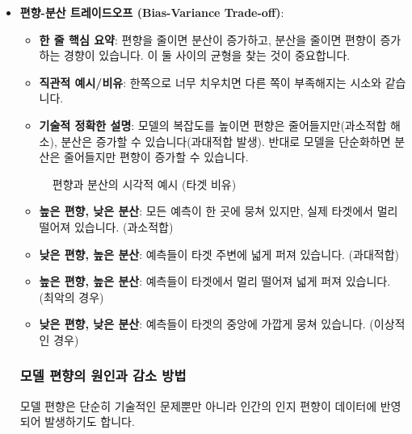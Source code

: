\documentclass[11pt,a4paper]{article}
\theoremstyle{definition}
\begin{document}
\begin{itemize}
\begin{itemize}
    \item \textbf{편향-분산 트레이드오프 (Bias-Variance Trade-off)}:
    \begin{itemize}
        \item \textbf{한 줄 핵심 요약}: 편향을 줄이면 분산이 증가하고, 분산을 줄이면 편향이 증가하는 경향이 있습니다. 이 둘 사이의 균형을 찾는 것이 중요합니다.
        \item \textbf{직관적 예시/비유}: 한쪽으로 너무 치우치면 다른 쪽이 부족해지는 시소와 같습니다.
        \item \textbf{기술적 정확한 설명}: 모델의 복잡도를 높이면 편향은 줄어들지만(과소적합 해소), 분산은 증가할 수 있습니다(과대적합 발생). 반대로 모델을 단순화하면 분산은 줄어들지만 편향이 증가할 수 있습니다.
    \end{itemize}

    \begin{figure}[h!]
        \centering
        \caption{편향과 분산의 시각적 예시 (타겟 비유)}
        \label{fig:bias_variance}
    \end{figure}
    \begin{itemize}
        \item \textbf{높은 편향, 낮은 분산}: 모든 예측이 한 곳에 뭉쳐 있지만, 실제 타겟에서 멀리 떨어져 있습니다. (과소적합)
        \item \textbf{낮은 편향, 높은 분산}: 예측들이 타겟 주변에 넓게 퍼져 있습니다. (과대적합)
        \item \textbf{높은 편향, 높은 분산}: 예측들이 타겟에서 멀리 떨어져 넓게 퍼져 있습니다. (최악의 경우)
        \item \textbf{낮은 편향, 낮은 분산}: 예측들이 타겟의 중앙에 가깝게 뭉쳐 있습니다. (이상적인 경우)
    \end{itemize}

    \subsubsection*{모델 편향의 원인과 감소 방법}

    모델 편향은 단순히 기술적인 문제뿐만 아니라 인간의 인지 편향이 데이터에 반영되어 발생하기도 합니다.


\end{itemize}
\end{itemize}
\end{document}
